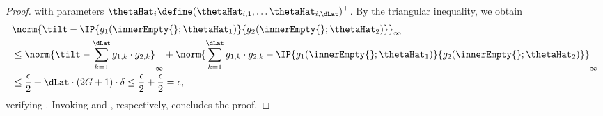 \documentclass{article}
\begin{document}
\begin{proof}
 with parameters $\thetaHat_i \define (\thetaHat_{i,1}, \ldots \thetaHat_{i,\dLat})^\top$.
 By the triangular inequality, we obtain
 \begin{align*}
   & \norm{\tilt - \IP{g_1(\innerEmpty{};\thetaHat_1)}{g_2(\innerEmpty{};\thetaHat_2)}}_{\infty} \\
   & \leq \norm{\tilt - \sum_{k=1}^{\dLat} g_{1,k}\cdot g_{2,k}}_{\infty}
  +\norm{\sum_{k=1}^{\dLat} g_{1,k}\cdot g_{2,k}
  - \IP{g_1(\innerEmpty{};\thetaHat_1)}{g_2(\innerEmpty{};\thetaHat_2)}}_{\infty}                \\
   & \leq \frac{\epsilon}{2} + \dLat \cdot (2G+1) \cdot \delta
  \leq \frac{\epsilon}{2} + \frac{\epsilon}{2} = \epsilon,
 \end{align*}
 verifying .
 Invoking
  and
 , respectively,
 concludes the proof.
\end{proof}
\end{document}
